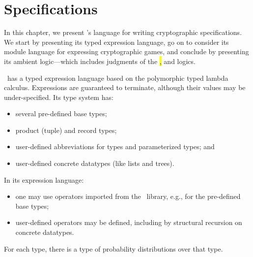 \chapter{Specifications}
\label{Specifications}

In this chapter, we present \EasyCrypt's language for writing
cryptographic specifications.  We start by presenting its typed
expression language, go on to consider its module language for
expressing cryptographic games, and conclude by presenting its
ambient logic---which includes judgments of the \hl, \phl and \prhl
logics.

\EasyCrypt\ has a typed expression language based on the polymorphic
typed lambda calculus. Expressions are guaranteed to terminate,
although their values may be under-specified.  Its type system has:
\begin{itemize}
\item several pre-defined base types;

\item product (tuple) and record types;

\item user-defined abbreviations for types and parameterized types; and

\item user-defined concrete datatypes (like lists and trees).
\end{itemize}
In its expression language:
\begin{itemize}
\item one may use operators imported from the \EasyCrypt\ library, e.g.,
  for the pre-defined base types;

\item user-defined operators may be defined, including by
  structural recursion on concrete datatypes.
\end{itemize}
For each type, there is a type of probability distributions over that
type.

